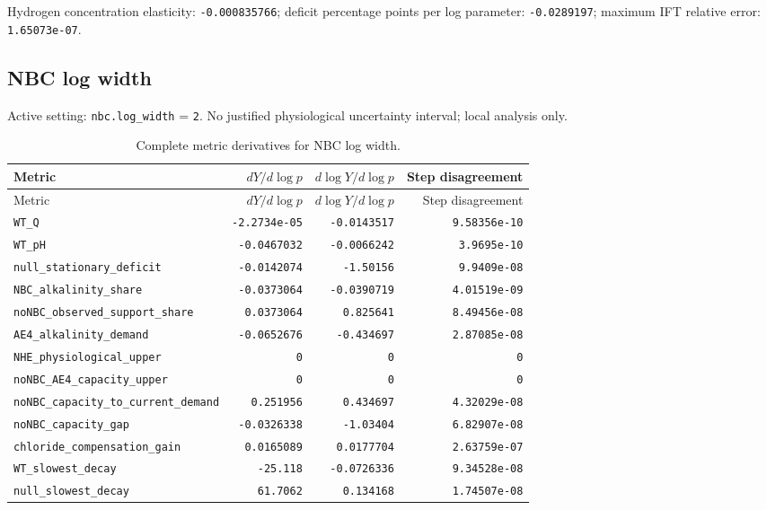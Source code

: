 Hydrogen concentration elasticity: \texttt{-0.000835766}; deficit percentage points per log parameter: \texttt{-0.0289197}; maximum IFT relative error: \texttt{1.65073e-07}.\par

\subsection*{NBC log width}
Active setting: \nolinkurl{nbc.log_width} = \texttt{2}. No justified physiological uncertainty interval; local analysis only.


\begingroup\scriptsize
\setlength{\tabcolsep}{3pt}
\begin{longtable}{p{.44\linewidth}rrr}
\caption{Complete metric derivatives for NBC log width.}\\
\toprule
Metric & $dY/d\log p$ & $d\log Y/d\log p$ & Step disagreement \\
\midrule\endfirsthead
\toprule
Metric & $dY/d\log p$ & $d\log Y/d\log p$ & Step disagreement \\
\midrule\endhead
\bottomrule\endfoot
\nolinkurl{WT_Q} & \texttt{-2.2734e-05} & \texttt{-0.0143517} & \texttt{9.58356e-10} \\
\nolinkurl{WT_pH} & \texttt{-0.0467032} & \texttt{-0.0066242} & \texttt{3.9695e-10} \\
\nolinkurl{null_stationary_deficit} & \texttt{-0.0142074} & \texttt{-1.50156} & \texttt{9.9409e-08} \\
\nolinkurl{NBC_alkalinity_share} & \texttt{-0.0373064} & \texttt{-0.0390719} & \texttt{4.01519e-09} \\
\nolinkurl{noNBC_observed_support_share} & \texttt{0.0373064} & \texttt{0.825641} & \texttt{8.49456e-08} \\
\nolinkurl{AE4_alkalinity_demand} & \texttt{-0.0652676} & \texttt{-0.434697} & \texttt{2.87085e-08} \\
\nolinkurl{NHE_physiological_upper} & \texttt{0} & \texttt{0} & \texttt{0} \\
\nolinkurl{noNBC_AE4_capacity_upper} & \texttt{0} & \texttt{0} & \texttt{0} \\
\nolinkurl{noNBC_capacity_to_current_demand} & \texttt{0.251956} & \texttt{0.434697} & \texttt{4.32029e-08} \\
\nolinkurl{noNBC_capacity_gap} & \texttt{-0.0326338} & \texttt{-1.03404} & \texttt{6.82907e-08} \\
\nolinkurl{chloride_compensation_gain} & \texttt{0.0165089} & \texttt{0.0177704} & \texttt{2.63759e-07} \\
\nolinkurl{WT_slowest_decay} & \texttt{-25.118} & \texttt{-0.0726336} & \texttt{9.34528e-08} \\
\nolinkurl{null_slowest_decay} & \texttt{61.7062} & \texttt{0.134168} & \texttt{1.74507e-08} \\
\end{longtable}
\endgroup

